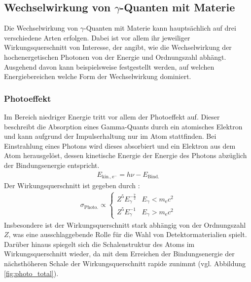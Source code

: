 \documentclass[11pt, a4paper]{article}
\numberwithin{equation}{section}
\begin{document}
\subsection{Wechselwirkung von $\gamma$-Quanten mit Materie}
\label{sec:ww}

Die Wechselwirkung von $\gamma$-Quanten mit Materie kann hauptsächlich auf drei verschiedene Arten erfolgen.
Dabei ist vor allem ihr jeweiliger Wirkungsquerschnitt von Interesse, der angibt, wie die Wechselwirkung der hochenergetischen Photonen von der Energie und Ordnungszahl abhängt.
Ausgehend davon kann beispielsweise festgestellt werden, auf welchen Energiebereichen welche Form der Wechselwirkung dominiert.

\subsubsection{Photoeffekt}
\label{sec:theo_photoeffekt}
Im Bereich niedriger Energie tritt vor allem der Photoeffekt auf.
Dieser beschreibt die Absorption eines Gamma-Quants durch ein atomisches Elektron und kann aufgrund der Impulserhaltung nur im Atom stattfinden.
Bei Einstrahlung eines Photons wird dieses absorbiert und ein Elektron aus dem Atom herausgelöst, dessen kinetische Energie der Energie des Photons abzüglich der Bindungsenergie entspricht.
\begin{align*}
E_\mathrm{kin., e^{-}} = h \nu - E_\mathrm{Bind.}
\end{align*}
Der Wirkungsquerschnitt ist gegeben durch \cite{siegbahn}:
\begin{align*}
	\sigma_\mathrm{Photo.} \propto
	\begin{cases}
		Z^5 E_\gamma^{-\frac{7}{2}} & E_\gamma < m_\mathrm{e} c^2 \\
		Z^5 E_\gamma^{-1} & E_\gamma > m_\mathrm{e} c^2
	\end{cases}
\end{align*}
Insbesondere ist der Wirkungsquerschnitt stark abhängig von der Ordnungszahl $Z$, was eine ausschlaggebende Rolle für die Wahl von Detektormaterialien spielt. Darüber hinaus spiegelt sich die Schalenstruktur des Atoms im Wirkungsquerschnitt wieder, da mit dem Erreichen der Bindungsenergie der nächsthöheren Schale der Wirkungsquerschnitt rapide zunimmt (vgl. Abbildung \ref{fig:photo_total}).
\end{document}
